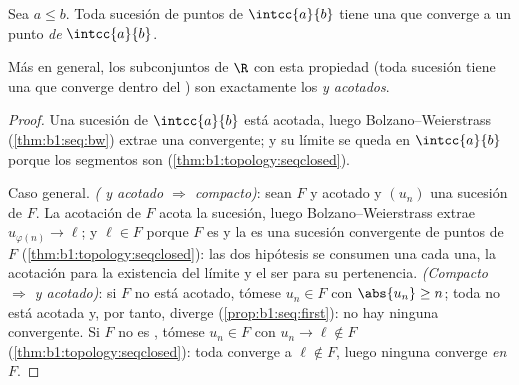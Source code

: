 \begin{theorem}\label{thm:b1:topology:compact}
Sea $a \leq b$. Toda sucesión de puntos de $\intcc{a}{b}$ tiene una
 que converge a un punto \emph{de}
$\intcc{a}{b}$.

Más en general, los subconjuntos de $\R$ con esta propiedad (toda
sucesión tiene una  que converge dentro del ) son
exactamente los  \emph{ y acotados}.
\end{theorem}

\begin{proof}
Una sucesión de $\intcc{a}{b}$ está acotada, luego
Bolzano--Weierstrass (\cref{thm:b1:seq:bw}) extrae una 
convergente; y su límite se queda en $\intcc{a}{b}$ porque los
segmentos son  (\cref{thm:b1:topology:seqclosed}).

Caso general. \emph{( y acotado $\Rightarrow$ compacto)}: sean
$F$  y acotado y $(u_n)$ una sucesión de $F$. La acotación de
$F$ acota la sucesión, luego Bolzano--Weierstrass extrae
$u_{\varphi(n)} \to \ell$; y $\ell \in F$ porque $F$ es  y la
 es una sucesión convergente de puntos de $F$
(\cref{thm:b1:topology:seqclosed}): las dos hipótesis se consumen una
cada una, la acotación para la existencia del límite y el ser 
para su pertenencia. \emph{(Compacto $\Rightarrow$  y
acotado)}: si $F$ no está acotado, tómese $u_n \in F$ con
$\abs{u_n} \geq n$; toda  no está acotada y, por tanto,
diverge (\cref{prop:b1:seq:first}): no hay ninguna 
convergente. Si $F$ no es , tómese $u_n \in F$ con
$u_n \to \ell \notin F$ (\cref{thm:b1:topology:seqclosed}): toda
 converge a $\ell \notin F$, luego ninguna converge
\emph{en} $F$.
\end{proof}

